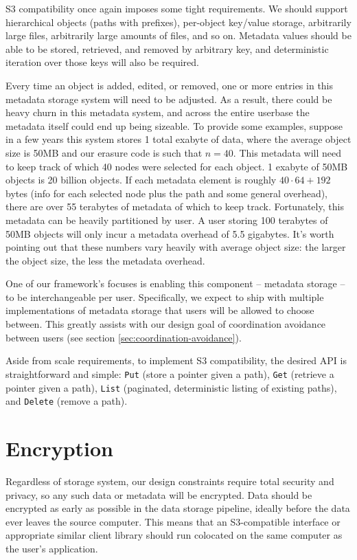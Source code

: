 \documentclass[11pt,fleqn,openany]{book}
\newcommand{\x}[1]{{\tt #1}} \newcommand{\code}[1]{{\em #1}}
\begin{document}
S3 compatibility once again imposes some tight requirements.
We should support
hierarchical objects (paths with prefixes), per-object key/value storage,
arbitrarily large files, arbitrarily large amounts of files, and so on.
Metadata values
should be able to be stored, retrieved, and removed by arbitrary key, and
deterministic iteration over those keys will also be required.

Every time an
object is added, edited, or removed, one or more entries in this metadata
storage system will need to be adjusted. As a result, there could be heavy churn
in this metadata system, and across the entire userbase the metadata itself
could end up being sizeable.
To provide some examples, suppose in
a few years this system stores 1 total exabyte of data, where the average object
size is 50MB and our erasure code is such that $n=40$. This metadata will need
to keep track of which 40 nodes were selected for each object.
1 exabyte of 50MB objects is 20 billion objects. If
each metadata element is roughly $40\cdot 64+192$ bytes (info for each
selected node plus the path and some general overhead), there are over 55
terabytes of metadata of which to keep track.
Fortunately, this metadata can be heavily partitioned by user. A user storing
100 terabytes of 50MB objects will only incur a metadata overhead of 5.5
gigabytes. It's worth pointing out that these numbers vary
heavily with average object size: the larger the object size, the less the
metadata overhead.

One of our framework's focuses is enabling this component -- metadata
storage -- to be interchangeable per user. Specifically, we expect to ship with
multiple implementations of metadata storage that users will be allowed to
choose between. This greatly assists with our design goal of coordination
avoidance between users (see section \ref{sec:coordination-avoidance}).

Aside from scale requirements, to implement S3 compatibility,
the desired API is straightforward and
simple: \x{Put} (store a pointer given a path), \x{Get} (retrieve a pointer
given a path),
\x{List} (paginated, deterministic listing of existing paths), and \x{Delete}
(remove a path).

\section{Encryption}

Regardless of storage system, our design constraints require total security
and privacy, so any such data or metadata will be encrypted.
Data should be encrypted as early as possible in the data storage pipeline,
ideally before the data ever leaves the source computer. This means that an
S3-compatible interface or appropriate similar client library should run
colocated on the same computer as the user's application.
\end{document}
